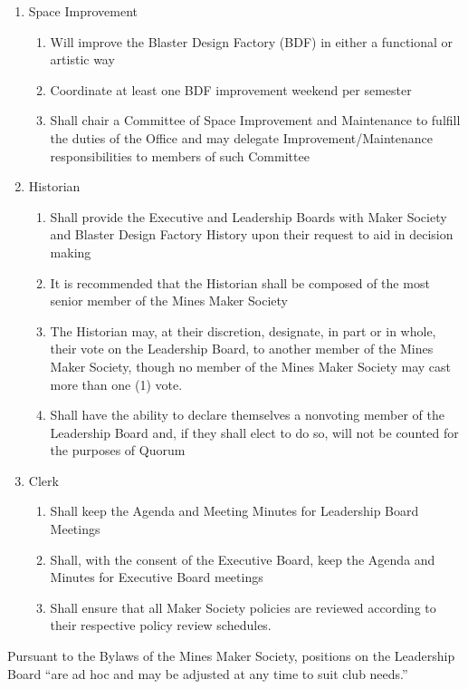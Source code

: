\documentclass[12pt,letterpaper]{article}
\begin{document}
\begin{enumerate}
    \item Space Improvement 
    \begin{enumerate}
        \item Will improve the Blaster Design Factory (BDF) in either a functional or artistic way
        \item Coordinate at least one BDF improvement weekend per semester
        \item Shall chair a Committee of Space Improvement and Maintenance to fulfill the duties of the Office and may delegate Improvement/Maintenance responsibilities to members of such Committee
    \end{enumerate}
    \item Historian 
    \begin{enumerate}
        \item Shall provide the Executive and Leadership Boards with Maker Society and Blaster Design Factory History upon their request to aid in decision making
        \item It is recommended that the Historian shall be composed of the most senior member of the Mines Maker Society
        \item The Historian may, at their discretion, designate, in part or in whole, their vote on the Leadership Board, to another member of the Mines Maker Society, though no member of the Mines Maker Society may cast more than one (1) vote.
        \item Shall have the ability to declare themselves a nonvoting member of the Leadership Board and, if they shall elect to do so, will not be counted for the purposes of Quorum
    \end{enumerate}
    \item Clerk
    \begin{enumerate}
        \item Shall keep the Agenda and Meeting Minutes for Leadership Board Meetings
        \item Shall, with the consent of the Executive Board, keep the Agenda and Minutes for Executive Board meetings
        \item Shall ensure that all Maker Society policies are reviewed according to their respective policy review schedules.
    \end{enumerate}
\end{enumerate}


Pursuant to the Bylaws of the Mines Maker Society, positions on the Leadership Board “are ad hoc and may be adjusted at any time to suit club needs.” 
\end{document}
